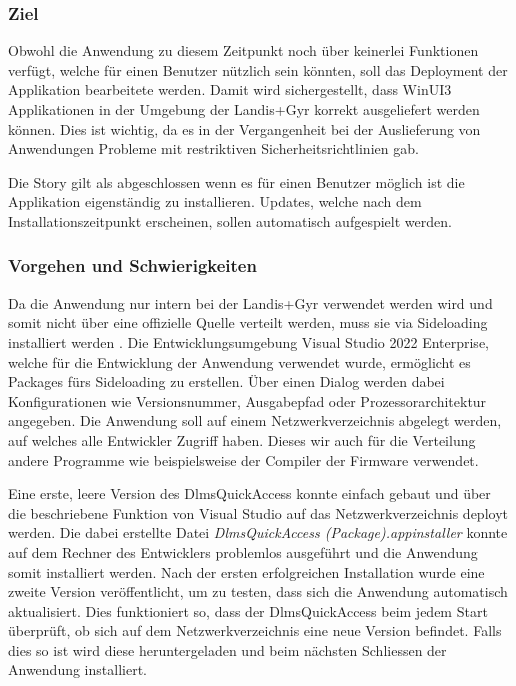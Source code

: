 \subsubsection{Ziel}
Obwohl die Anwendung zu diesem Zeitpunkt noch über keinerlei Funktionen verfügt, welche für einen Benutzer nützlich sein könnten, soll das Deployment der Applikation bearbeitete werden.
Damit wird sichergestellt, dass WinUI3 Applikationen in der Umgebung der Landis+Gyr korrekt ausgeliefert werden können.
Dies ist wichtig, da es in der Vergangenheit bei der Auslieferung von Anwendungen Probleme mit restriktiven Sicherheitsrichtlinien gab.

Die Story gilt als abgeschlossen wenn es für einen Benutzer möglich ist die Applikation eigenständig zu installieren.
Updates, welche nach dem Installationszeitpunkt erscheinen, sollen automatisch aufgespielt werden.

\subsubsection{Vorgehen und Schwierigkeiten}
Da die Anwendung nur intern bei der Landis+Gyr verwendet werden wird und somit nicht über eine offizielle Quelle verteilt werden, muss sie via Sideloading installiert werden \parencite{sideload}.
Die Entwicklungsumgebung Visual Studio 2022 Enterprise, welche für die Entwicklung der Anwendung verwendet wurde, ermöglicht es Packages fürs Sideloading zu erstellen.
Über einen Dialog werden dabei Konfigurationen wie Versionsnummer, Ausgabepfad oder Prozessorarchitektur angegeben.
Die Anwendung soll auf einem Netzwerkverzeichnis abgelegt werden, auf welches alle Entwickler Zugriff haben.
Dieses wir auch für die Verteilung andere Programme wie beispielsweise der Compiler der Firmware verwendet.

Eine erste, leere Version des DlmsQuickAccess konnte einfach gebaut und über die beschriebene Funktion von Visual Studio auf das Netzwerkverzeichnis deployt werden.
Die dabei erstellte Datei \textit{DlmsQuickAccess (Package).appinstaller} konnte auf dem Rechner des Entwicklers problemlos ausgeführt und die Anwendung somit installiert werden.
Nach der ersten erfolgreichen Installation wurde eine zweite Version veröffentlicht, um zu testen, dass sich die Anwendung automatisch aktualisiert.
Dies funktioniert so, dass der DlmsQuickAccess beim jedem Start überprüft, ob sich auf dem Netzwerkverzeichnis eine neue Version befindet.
Falls dies so ist wird diese heruntergeladen und beim nächsten Schliessen der Anwendung installiert.

